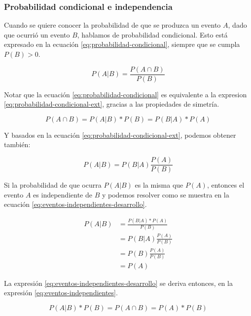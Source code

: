 \documentclass[]{article}
\begin{document}
\subsubsection{Probabilidad condicional e
independencia}\label{probabilidad-condicional-e-independencia}

Cuando se quiere conocer la probabilidad de que se produzca un evento
\(A\), dado que ocurrió un evento \(B\), hablamos de probabilidad
condicional. Esto está expresado en la ecuación
\eqref{eq:probabilidad-condicional}, siempre que se cumpla \(P(B) > 0\).

\begin{equation}
P(A|B) = \frac{P(A \cap B)}{P(B)}
\label{eq:probabilidad-condicional}
\end{equation}

Notar que la ecuación \eqref{eq:probabilidad-condicional} es equivalente a
la expresion \eqref{eq:probabilidad-condicional-ext}, gracias a las
propiedades de simetría.

\begin{equation}
P(A \cap B) = P(A|B) * P(B) = P(B|A) * P(A)
\label{eq:probabilidad-condicional-ext}
\end{equation}

Y basados en la ecuación \eqref{eq:probabilidad-condicional-ext}, podemos
obtener también:

\begin{equation}
P(A|B) = P(B|A) \frac{P(A)}{P(B)}
\label{eq:probabilidad-condicional-ext2}
\end{equation}

Si la probabilidad de que ocurra \(P(A|B)\) es la misma que \(P(A)\),
entonces el evento \(A\) es independiente de \(B\) y podemos resolver
como se muestra en la ecuación
\eqref{eq:eventos-independientes-desarrollo}.

\begin{align}
P(A|B) &= \frac{P(B|A) * P(A)}{P(B)} \\
       &= P(B|A) \frac{P(A)} {P(B)} \\
       &= P(B) \frac{P(A)} {P(B)} \\
       &= P(A)
\label{eq:eventos-independientes-desarrollo}
\end{align}

La expresión \eqref{eq:eventos-independientes-desarrollo} se deriva
entonces, en la expresión \eqref{eq:eventos-independientes}.

\begin{equation}
P(A|B) * P(B) = P(A \cap B) = P(A) * P(B)
\label{eq:eventos-independientes}
\end{equation}
\end{document}
